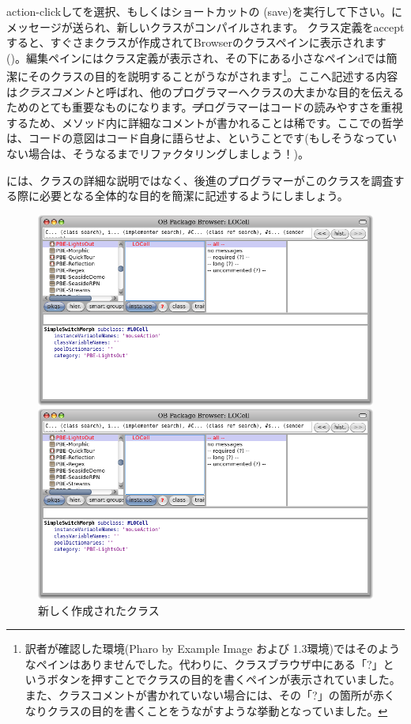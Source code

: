\documentclass[a4paper,10pt,twoside]{book}
\begin{document}
action-clickしてを選択、もしくはショートカットの (save)を実行して下さい。にメッセージが送られ、新しいクラスがコンパイルされます。
クラス定義をacceptすると、すぐさまクラスが作成されてBrowserのクラスペインに表示されます()。編集ペインにはクラス定義が表示され、その下にある小さなペインdでは簡潔にそのクラスの目的を説明することがうながされます\footnote{訳者が確認した環境(Pharo by Example Image および 1.3環境)ではそのようなペインはありませんでした。代わりに、クラスブラウザ中にある「?」というボタンを押すことでクラスの目的を書くペインが表示されていました。また、クラスコメントが書かれていない場合には、その「?」の箇所が赤くなりクラスの目的を書くことをうながすような挙動となっていました。}。ここへ記述する内容は\emph{クラスコメント}と呼ばれ、他のプログラマーへクラスの大まかな目的を伝えるためのとても重要なものになります。\st プログラマーはコードの読みやすさを重視するため、メソッド内に詳細なコメントが書かれることは稀です。ここでの哲学は、コードの意図はコード自身に語らせよ、ということです(もしそうなっていない場合は、そうなるまでリファクタリングしましょう！)。


には、クラスの詳細な説明ではなく、後進のプログラマーがこのクラスを調査する際に必要となる全体的な目的を簡潔に記述するようにしましょう。


\begin{figure}[h!t]
\ifluluelse
	{\centerline {\includegraphics[width=\textwidth]{LOCell}}}
	{\centerline {\includegraphics[scale=0.7]{LOCell}}}
\caption{新しく作成されたクラス }
\end{figure}
\end{document}
